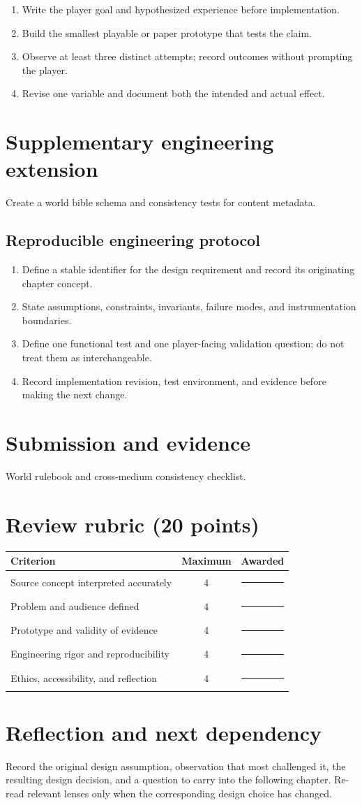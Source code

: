 \documentclass[11pt]{article}
\begin{document}
\begin{enumerate}
\item Write the player goal and hypothesized experience before implementation.
\item Build the smallest playable or paper prototype that tests the claim.
\item Observe at least three distinct attempts; record outcomes without prompting the player.
\item Revise one variable and document both the intended and actual effect.
\end{enumerate}

\section{Supplementary engineering extension}
Create a world bible schema and consistency tests for content metadata.


\subsection{Reproducible engineering protocol}
\begin{enumerate}
\item Define a stable identifier for the design requirement and record its originating chapter concept.
\item State assumptions, constraints, invariants, failure modes, and instrumentation boundaries.
\item Define one functional test and one player-facing validation question; do not treat them as interchangeable.
\item Record implementation revision, test environment, and evidence before making the next change.
\end{enumerate}

\section{Submission and evidence}
World rulebook and cross-medium consistency checklist.


\section{Review rubric (20 points)}
\begin{tabularx}{\linewidth}{@{}Xcc@{}}\toprule
Criterion & Maximum & Awarded \\ \midrule
Source concept interpreted accurately & 4 & \rule{0.45in}{0.4pt}\\
Problem and audience defined & 4 & \rule{0.45in}{0.4pt}\\
Prototype and validity of evidence & 4 & \rule{0.45in}{0.4pt}\\
Engineering rigor and reproducibility & 4 & \rule{0.45in}{0.4pt}\\
Ethics, accessibility, and reflection & 4 & \rule{0.45in}{0.4pt}\\\bottomrule
\end{tabularx}

\section{Reflection and next dependency}
Record the original design assumption, observation that most challenged it, the resulting design decision, and a question to carry into the following chapter. Re-read relevant lenses only when the corresponding design choice has changed.
\end{document}
